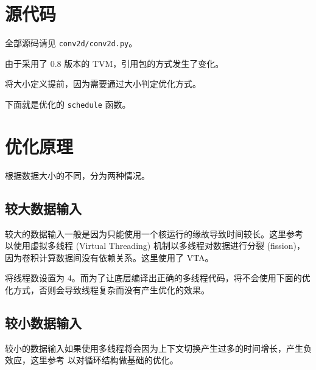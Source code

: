 \documentclass[UTF8]{ctexart}
\begin{document}

\section{源代码}

全部源码请见 \verb"conv2d/conv2d.py"。


由于采用了 0.8 版本的 TVM，引用包的方式发生了变化。



将大小定义提前，因为需要通过大小判定优化方式。



下面就是优化的 \verb"schedule" 函数。



\section{优化原理}

根据数据大小的不同，分为两种情况。

\subsection{较大数据输入}

较大的数据输入一般是因为只能使用一个核运行的缘故导致时间较长。这里参考 \cite{vta} 以使用虚拟多线程 (Virtual Threading) 机制以多线程对数据进行分裂 (fission)，因为卷积计算数据间没有依赖关系。这里使用了 VTA。

将线程数设置为 4。而为了让底层编译出正确的多线程代码，将不会使用下面的优化方式，否则会导致线程复杂而没有产生优化的效果。

\subsection{较小数据输入}

\lstset{numbers=none}

较小的数据输入如果使用多线程将会因为上下文切换产生过多的时间增长，产生负效应，这里参考 \cite{cpu} 以对循环结构做基础的优化。
\end{document}
